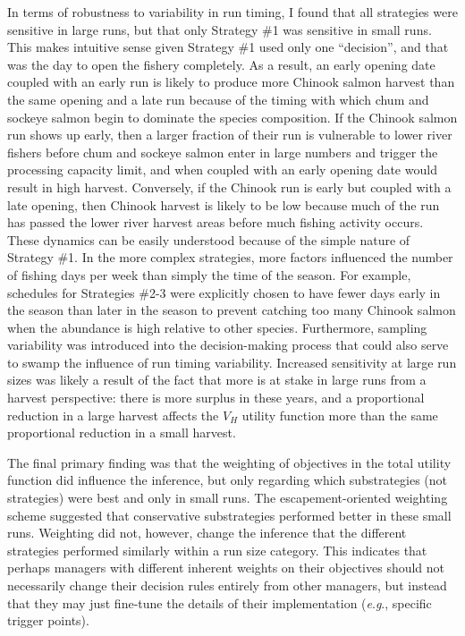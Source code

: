 \documentclass[12pt,]{book}
\theoremstyle{definition}
\theoremstyle{definition}
\theoremstyle{definition}
\theoremstyle{remark}
\begin{document}
In terms of robustness to variability in run timing, I found that all
strategies were sensitive in large runs, but that only Strategy \#1 was
sensitive in small runs. This makes intuitive sense given Strategy \#1
used only one ``decision'', and that was the day to open the fishery
completely. As a result, an early opening date coupled with an early run
is likely to produce more Chinook salmon harvest than the same opening
and a late run because of the timing with which chum and sockeye salmon
begin to dominate the species composition. If the Chinook salmon run
shows up early, then a larger fraction of their run is vulnerable to
lower river fishers before chum and sockeye salmon enter in large
numbers and trigger the processing capacity limit, and when coupled with
an early opening date would result in high harvest. Conversely, if the
Chinook run is early but coupled with a late opening, then Chinook
harvest is likely to be low because much of the run has passed the lower
river harvest areas before much fishing activity occurs. These dynamics
can be easily understood because of the simple nature of Strategy \#1.
In the more complex strategies, more factors influenced the number of
fishing days per week than simply the time of the season. For example,
schedules for Strategies \#2-3 were explicitly chosen to have fewer days
early in the season than later in the season to prevent catching too
many Chinook salmon when the abundance is high relative to other
species. Furthermore, sampling variability was introduced into the
decision-making process that could also serve to swamp the influence of
run timing variability. Increased sensitivity at large run sizes was
likely a result of the fact that more is at stake in large runs from a
harvest perspective: there is more surplus in these years, and a
proportional reduction in a large harvest affects the \(V_H\) utility
function more than the same proportional reduction in a small harvest.

The final primary finding was that the weighting of objectives in the
total utility function did influence the inference, but only regarding
which substrategies (not strategies) were best and only in small runs.
The escapement-oriented weighting scheme suggested that conservative
substrategies performed better in these small runs. Weighting did not,
however, change the inference that the different strategies performed
similarly within a run size category. This indicates that perhaps
managers with different inherent weights on their objectives should not
necessarily change their decision rules entirely from other managers,
but instead that they may just fine-tune the details of their
implementation (\emph{e}.\emph{g}., specific trigger points).
\end{document}
